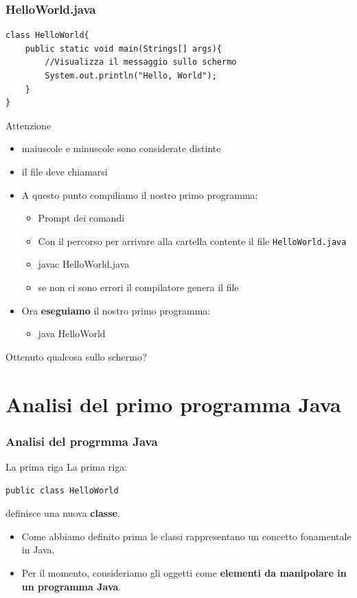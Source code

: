 \begin{frame}[fragile]
\frametitle{HelloWorld.java}
\begin{lstlisting}
class HelloWorld{
    public static void main(Strings[] args){
        //Visualizza il messaggio sullo schermo
        System.out.println("Hello, World");
    }
}
\end{lstlisting}
\begin{block}{Attenzione}
\begin{itemize}
\item maiuscole e minuscole sono considerate distinte
\item il file \alert{deve} chiamarsi 
\end{itemize}
\end{block}
\end{frame}

\begin{frame}
\begin{itemize}
\item A questo punto compiliamo il nostro primo programma: 
\begin{itemize}
\item Prompt dei comandi
\pause
\item {} Con il percorso per arrivare alla cartella contente il file \texttt{HelloWorld.java}
\pause
\item \alert{javac HelloWorld.java}
\pause
\item se non ci sono errori il compilatore genera il file 
\end{itemize}
\pause
\item Ora \textbf{eseguiamo} il nostro primo programma:
\begin{itemize}
\item \alert{java HelloWorld}
\end{itemize}
\end{itemize}
\pause
Ottenuto qualcosa sullo schermo?
\end{frame}

\section*{Analisi del primo programma Java}
\begin{frame}[fragile]
\frametitle{Analisi del progrmma Java}
\begin{block}{La prima riga}
La prima riga:
\begin{lstlisting} 
public class HelloWorld 
\end{lstlisting}
definisce una nuova \textbf{classe}.
\begin{itemize}
\item Come abbiamo definito prima le classi rappresentano un concetto fonamentale in Java.
\item Per il momento, consideriamo gli oggetti come \textbf{elementi da manipolare in un programma Java}.
\end{itemize}
\end{block} 
\end{frame}
